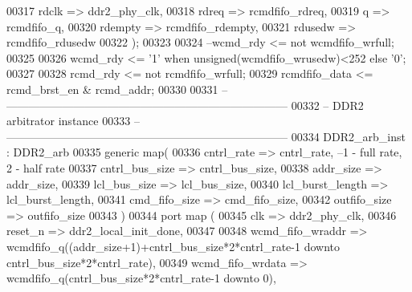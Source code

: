 \begin{DoxyCode}
00317       rdclk          => ddr2_phy_clk, 
00318       rdreq         => rcmdfifo_rdreq, 
00319       q             => rcmdfifo_q, 
00320       rdempty       => rcmdfifo_rdempty, 
00321       rdusedw       => rcmdfifo_rdusedw   
00322 \textcolor{vhdlchar}{)};
00323 
00324 \textcolor{keyword}{--wcmd\_rdy      <= not wcmdfifo\_wrfull;}
00325 
00326 \textcolor{vhdlchar}{wcmd_rdy}        \textcolor{vhdlchar}{<=} \textcolor{vhdlchar}{'}\textcolor{vhdllogic}{}\textcolor{vhdllogic}{1}\textcolor{vhdlchar}{'} \textcolor{keywordflow}{when} \textcolor{comment}{unsigned}\textcolor{vhdlchar}{(}\textcolor{vhdlchar}{wcmdfifo_wrusedw}\textcolor{vhdlchar}{)}\textcolor{vhdlchar}{<}\textcolor{vhdllogic}{}\textcolor{vhdllogic}{252} \textcolor{keywordflow}{else} \textcolor{vhdlchar}{'}\textcolor{vhdllogic}{}\textcolor{vhdllogic}{0}\textcolor{vhdlchar}{'};
00327 
00328 \textcolor{vhdlchar}{rcmd_rdy}        \textcolor{vhdlchar}{<=} \textcolor{keywordflow}{not} \textcolor{vhdlchar}{rcmdfifo_wrfull};
00329 \textcolor{vhdlchar}{rcmdfifo_data}   \textcolor{vhdlchar}{<=} \textcolor{vhdlchar}{rcmd_brst_en} \textcolor{vhdlchar}{&} \textcolor{vhdlchar}{rcmd_addr};
00330 
00331 \textcolor{keyword}{-- ---------------------------------------------------------------------------}
00332 \textcolor{keyword}{-- DDR2 arbitrator instance}
00333 \textcolor{keyword}{-- ---------------------------------------------------------------------------}
00334 DDR2\_arb\_inst :  DDR2_arb
00335     \textcolor{keywordflow}{generic} \textcolor{keywordflow}{map}(
00336         cntrl_rate          => cntrl_rate,\textcolor{keyword}{ --1 - full rate, 2 - half rate}
00337         cntrl_bus_size      => cntrl_bus_size,
00338         addr_size           => addr_size,
00339         lcl_bus_size        => lcl_bus_size,
00340         lcl_burst_length    => lcl_burst_length,
00341         cmd_fifo_size       => cmd_fifo_size,
00342         outfifo_size        => outfifo_size
00343         \textcolor{vhdlchar}{)}
00344   \textcolor{keywordflow}{port} \textcolor{keywordflow}{map} (
00345       clk                   => ddr2_phy_clk,
00346       reset_n               => ddr2_local_init_done,
00347 
00348         wcmd_fifo_wraddr    => wcmdfifo_q\textcolor{vhdlchar}{(}\textcolor{vhdlchar}{(}addr\_size+1\textcolor{vhdlchar}{)}+cntrl\_bus\_size*2*cntrl\_rate-\textcolor{vhdllogic}{1} \textcolor{keywordflow}{downto} 
      cntrl\_bus\_size*2*cntrl\_rate\textcolor{vhdlchar}{)},
00349         wcmd_fifo_wrdata    => wcmdfifo_q\textcolor{vhdlchar}{(}cntrl\_bus\_size*2*cntrl\_rate-\textcolor{vhdllogic}{1} \textcolor{keywordflow}{downto} \textcolor{vhdllogic}{0}\textcolor{vhdlchar}{)},

\end{DoxyCode}
